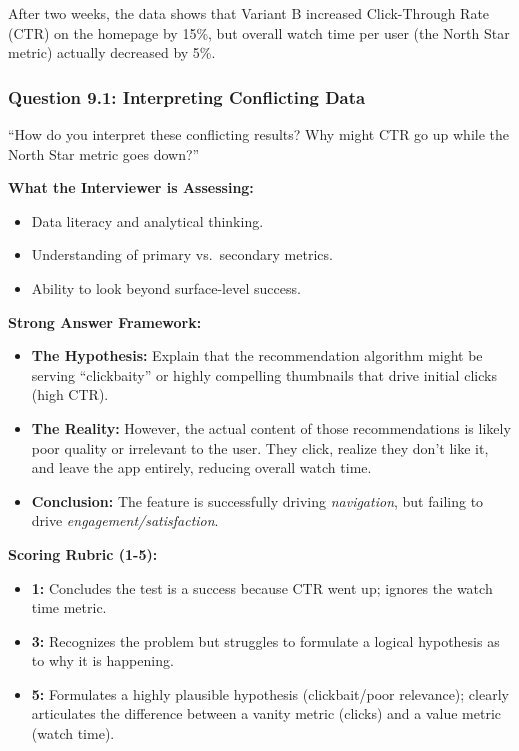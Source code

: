 After two weeks, the data shows that Variant B increased Click-Through
Rate (CTR) on the homepage by 15\%, but overall watch time per user (the
North Star metric) actually decreased by 5\%.

\subsubsection{Question 9.1: Interpreting Conflicting
Data}\label{question-9.1-interpreting-conflicting-data}

``How do you interpret these conflicting results? Why might CTR go up
while the North Star metric goes down?''

\textbf{What the Interviewer is Assessing:}

\begin{itemize}
\tightlist
\item
  Data literacy and analytical thinking.
\item
  Understanding of primary vs.~secondary metrics.
\item
  Ability to look beyond surface-level success.
\end{itemize}

\textbf{Strong Answer Framework:}

\begin{itemize}
\tightlist
\item
  \textbf{The Hypothesis:} Explain that the recommendation algorithm
  might be serving ``clickbaity'' or highly compelling thumbnails that
  drive initial clicks (high CTR).
\item
  \textbf{The Reality:} However, the actual content of those
  recommendations is likely poor quality or irrelevant to the user. They
  click, realize they don't like it, and leave the app entirely,
  reducing overall watch time.
\item
  \textbf{Conclusion:} The feature is successfully driving
  \emph{navigation}, but failing to drive
  \emph{engagement/satisfaction}.
\end{itemize}

\textbf{Scoring Rubric (1-5):}

\begin{itemize}
\tightlist
\item
  \textbf{1:} Concludes the test is a success because CTR went up;
  ignores the watch time metric.
\item
  \textbf{3:} Recognizes the problem but struggles to formulate a
  logical hypothesis as to why it is happening.
\item
  \textbf{5:} Formulates a highly plausible hypothesis (clickbait/poor
  relevance); clearly articulates the difference between a vanity metric
  (clicks) and a value metric (watch time).
\end{itemize}

